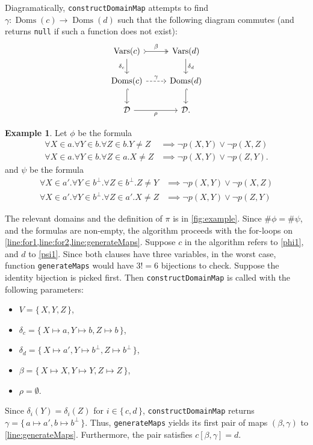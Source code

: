 \documentclass{article}
\theoremstyle{definition}
\newtheorem{example}{Example}
\theoremstyle{remark}
\DeclareMathOperator{\Doms}{Doms}
\DeclareMathOperator{\Vars}{Vars}
\begin{document}
Diagramatically, \texttt{constructDomainMap} attempts to find $\gamma\colon \Doms(c) \to \Doms(d)$ such that the following diagram commutes (and returns \texttt{null} if such a function does not exist):
\[
\begin{tikzcd}
  \Vars(c) \ar[r, tail, two heads, "\beta"] \arrow[d, swap, "\delta_c"] & \Vars(d) \ar[d, "\delta_d"] \\
  \Doms(c) \ar[r, dashed, "\gamma"] \ar[d, hookrightarrow] & \Doms(d) \ar[d, hookrightarrow] \\
  \mathcal{D} \ar[r, swap, "\rho"] & \mathcal{D}.
\end{tikzcd}
\]

\begin{example} \label{example}
  Let $\phi$ be the formula
  \begin{align}
    \forall X \in a. \forall Y \in b. \forall Z \in b. Y \ne Z &\implies \neg p(X, Y) \lor \neg p(X, Z)\label{phi1} \\
    \forall X \in a. \forall Y \in b. \forall Z \in a. X \ne Z &\implies \neg p(X, Y) \lor \neg p(Z, Y).\label{phi2}
  \end{align}
  and $\psi$ be the formula
  \begin{align}
    \forall X \in a'. \forall Y \in b^\bot. \forall Z \in b^\bot. Z \ne Y &\implies \neg p(X, Y) \lor \neg p(X, Z)\label{psi1} \\
    \forall X \in a'. \forall Y \in b^\bot. \forall Z \in a'. X \ne Z &\implies \neg p(X, Y) \lor \neg p(Z, Y)\label{psi2}
  \end{align}

  The relevant domains and the definition of $\pi$ is in \cref{fig:example}. Since $\#\phi = \#\psi$, and the formulas are non-empty, the algorithm proceeds with the for-loops on \cref{line:for1,line:for2,line:generateMaps}. Suppose $c$ in the algorithm refers to \cref{phi1}, and $d$ to \cref{psi1}. Since both clauses have three variables, in the worst case, function \texttt{generateMaps} would have $3!=6$ bijections to check. Suppose the identity bijection is picked first. Then \texttt{constructDomainMap} is called with the following parameters:
  \begin{itemize}
  \item $V = \{\, X, Y, Z \,\}$,
  \item $\delta_c = \{\, X \mapsto a, Y \mapsto b, Z \mapsto b \,\}$,
  \item $\delta_d = \{\, X \mapsto a', Y \mapsto b^\bot, Z \mapsto b^\bot \,\}$,
  \item $\beta = \{\, X \mapsto X, Y \mapsto Y, Z \mapsto Z \,\}$,
  \item $\rho = \emptyset$.
  \end{itemize}
  Since $\delta_i(Y) = \delta_i(Z)$ for $i \in \{\, c, d \,\}$, \texttt{constructDomainMap} returns $\gamma = \{\, a \mapsto a', b \mapsto b^\bot \,\}$. Thus, \texttt{generateMaps} yields its first pair of maps $(\beta, \gamma)$ to \cref{line:generateMaps}. Furthermore, the pair satisfies $c[\beta, \gamma] = d$.


\end{example}
\end{document}
